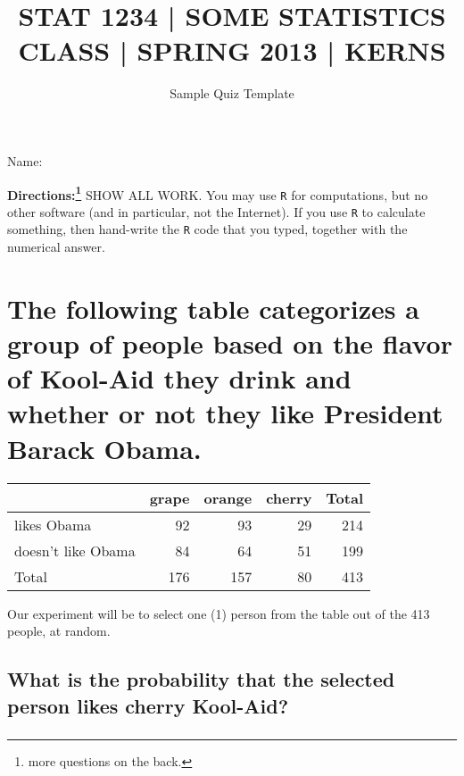 \documentclass[11pt]{article}
\date{\vspace{-0.5in}Sample Quiz Template}
\title{\vspace{-0.5in}\large STAT 1234 | SOME STATISTICS CLASS | SPRING 2013 | KERNS}
\begin{document}
\maketitle
\begin{flushright}
Name: \underbar{\makebox[2in]{}}
\par
\end{flushright}
\vspace{0.1in}

\noindent \textbf{Directions:\footnote{more questions on the back.}} SHOW ALL WORK. You may use \texttt{R} for
computations, but no other software (and in particular, not the
Internet). If you use \texttt{R} to calculate something, then hand-write the
\texttt{R} code that you typed, together with the numerical answer.

\section[The following table categorizes a group of people based on the flavor of Kool-Aid they drink and whether or not they like President Barack Obama.]{The following table categorizes a group of people based on the flavor of Kool-Aid they drink and whether or not they like President Barack Obama.}
\label{sec-1}

\begin{center}
\begin{tabular}{lrrrr}
 & grape & orange & cherry & Total\\
\hline
likes Obama & 92 & 93 & 29 & 214\\
doesn't like Obama & 84 & 64 & 51 & 199\\
Total & 176 & 157 & 80 & 413\\
\end{tabular}
\end{center}

Our experiment will be to select one (1) person from the table out
of the 413 people, at random.

\subsection[What is the probability that the selected person likes cherry Kool-Aid?]{What is the probability that the selected person likes cherry Kool-Aid?}
\label{sec-1-1}
\subsubsection[]{}
\label{sec-1-1-1}
\vspace{0.5in}
\end{document}
